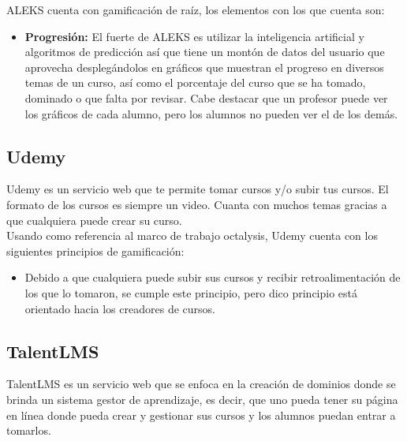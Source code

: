 \begin{multicols}{2}
    \noindent ALEKS cuenta con gamificación de raíz, los elementos con los que cuenta son:
    
    \begin{itemize}
        \item {\bf Progresión:} El fuerte de ALEKS es utilizar la inteligencia
        artificial y algoritmos de predicción así que tiene un montón de datos del
        usuario que aprovecha desplegándolos en gráficos que muestran el progreso
        en diversos temas de un curso, así como el porcentaje del curso que se ha
        tomado, dominado o que falta por revisar. Cabe destacar que un profesor puede
        ver los gráficos de cada alumno, pero los alumnos no pueden ver el de los demás.
        
    \end{itemize}
    
    
    
\subsection*{Udemy}

Udemy es un servicio web que te permite tomar cursos y/o subir tus cursos.
El formato de los cursos es siempre un video. Cuanta con muchos temas
gracias a que cualquiera puede crear su curso.\\

    \noindent Usando como referencia al marco de trabajo octalysis,
    Udemy cuenta con los siguientes principios de gamificación:
    
    \begin{itemize}
        \item {\bf \principioIII} Debido a que cualquiera puede subir
        sus cursos y recibir retroalimentación de los que lo tomaron,
        se cumple este principio, pero dico principio está orientado
        hacia los creadores de cursos.
        
    \end{itemize}
    
    
    
\subsection*{TalentLMS}

TalentLMS es un servicio web que se enfoca en la creación de dominios donde se
brinda un sistema gestor de aprendizaje, es decir, que uno pueda tener su página
en línea donde pueda crear y gestionar sus cursos y los alumnos puedan entrar a tomarlos.\\
    

\end{multicols}
